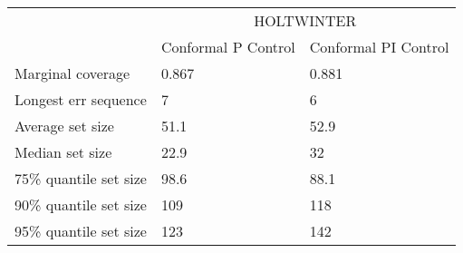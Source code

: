 \begin{tabular}{lll}
\toprule
& \multicolumn{2}{c}{HOLTWINTER} \\
& Conformal P Control & Conformal PI Control \\
\midrule
Marginal coverage & 0.867 & 0.881 \\
Longest err sequence & 7 & 6 \\
Average set size & 51.1 & 52.9 \\
Median set size & 22.9 & 32 \\
75\% quantile set size & 98.6 & 88.1 \\
90\% quantile set size & 109 & 118 \\
95\% quantile set size & 123 & 142 \\
\bottomrule
\end{tabular}
